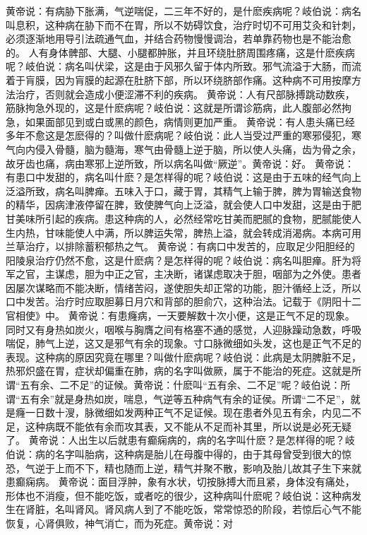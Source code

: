 \documentclass[a4paper,12pt,UTF8,twoside]{ctexbook}
\begin{document}
黄帝说：有病胁下胀满，气逆喘促，二三年不好的，是什麽疾病呢？岐伯说：病名叫息积，这种病在胁下而不在胃，所以不妨碍饮食，治疗时切不可用艾灸和针刺，必须逐渐地用导引法疏通气血，并结合药物慢慢调治，若单靠药物也是不能治愈的。
人有身体髀部、大腿、小腿都肿胀，并且环绕肚脐周围疼痛，这是什麽疾病呢？岐伯说：病名叫伏梁，这是由于风邪久留于体内所致。邪气流溢于大肠，而流着于肓膜，因为肓膜的起源在肚脐下部，所以环绕脐部作痛。这种病不可用按摩方法治疗，否则就会造成小便涩滞不利的疾病。
黄帝说：人有尺部脉搏跳动数疾，筋脉拘急外现的，这是什麽病呢？岐伯说：这就是所谓诊筋病，此人腹部必然拘急，如果面部见到或白或黑的颜色，病情则更加严重。
黄帝说：有人患头痛已经多年不愈这是怎麽得的？叫做什麽病呢？岐伯说：此人当受过严重的寒邪侵犯，寒气向内侵入骨髓，脑为髓海，寒气由骨髓上逆于脑，所以使人头痛，齿为骨之余，故牙齿也痛，病由寒邪上逆所致，所以病名叫做“厥逆”。黄帝说：好。
黄帝说：有患口中发甜的，病名叫什麽？是怎样得的呢？岐伯说：这是由于五味的经气向上泛溢所致，病名叫脾瘅。五味入于口，藏于胃，其精气上输于脾，脾为胃输送食物的精华，因病津液停留在脾，致使脾气向上泛溢，就会使人口中发甜，这是由于肥甘美味所引起的疾病。患这种病的人，必然经常吃甘美而肥腻的食物，肥腻能使人生内热，甘味能使人中满，所以脾运失常，脾热上溢，就会转成消渴病。本病可用兰草治疗，以排除蓄积郁热之气。
黄帝说：有病口中发苦的，应取足少阳胆经的阳陵泉治疗仍然不愈，这是什麽病？是怎样得的呢？岐伯说：病名叫胆瘅。肝为将军之官，主谋虑，胆为中正之官，主决断，诸谋虑取决于胆，咽部为之外使。患者因屡次谋略而不能决断，情绪苦闷，遂使胆失却正常的功能，胆汁循经上泛，所以口中发苦。治疗时应取胆募日月穴和背部的胆俞穴，这种治法。记载于《阴阳十二官相使》中。
黄帝说：有患癃病，一天要解数十次小便，这是正气不足的现象。同时又有身热如炭火，咽喉与胸膺之间有格塞不通的感觉，人迎脉躁动急数，呼吸喘促，肺气上逆，这又是邪气有余的现象。寸口脉微细如头发，这也是正气不足的表现。这种病的原因究竟在哪里？叫做什麽病呢？岐伯说：此病是太阴脾脏不足，热邪炽盛在胃，症状却偏重在肺，病的名字叫做厥，属于不能治的死症。这就是所谓“五有余、二不足”的证候。黄帝说：什麽叫“五有余、二不足”呢？岐伯说：所谓“五有余”就是身热如炭，喘息，气逆等五种病气有余的证侯。所谓“二不足”，就是癃一日数十溲，脉微细如发两种正气不足证候。现在患者外见五有余，内见二不足，这种病既不能依有余而攻其表，又不能从不足而补其里，所以说是必死无疑了。
黄帝说：人出生以后就患有癫痫病的，病的名字叫什麽？是怎样得的呢？岐伯说：病的名字叫胎病，这种病是胎儿在母腹中得的，由于其母曾受到很大的惊恐，气逆于上而不下，精也随而上逆，精气并聚不散，影响及胎儿故其子生下来就患癫痫病。
黄帝说：面目浮肿，象有水状，切按脉搏大而且紧，身体没有痛处，形体也不消瘦，但不能吃饭，或者吃的很少，这种病叫什麽呢？岐伯说：这种病发生在肾脏，名叫肾风。肾风病人到了不能吃饭，常常惊恐的阶段，若惊后心气不能恢复，心肾俱败，神气消亡，而为死症。黄帝说：对
\end{document}
